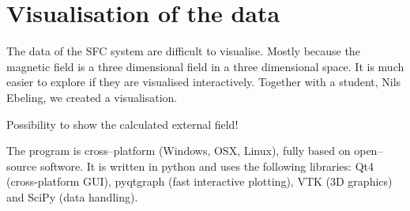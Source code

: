 \section{Visualisation of the data}
The data of the SFC system are difficult to visualise. Mostly because the magnetic field is a three dimensional field in a three dimensional space. It is much easier to explore if they are visualised interactively. Together with a student, Nils Ebeling, we created a visualisation.

Possibility to show the calculated external field!

The program is cross--platform (Windows, OSX, Linux), fully based on open--source softwore. It is written in python and uses the following libraries: Qt4 (cross-platform GUI), pyqtgraph (fast interactive plotting), VTK (3D graphics) and SciPy (data handling).

